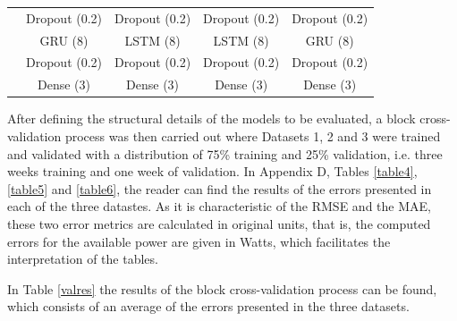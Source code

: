\begin{table}[htbp]
\begin{tabular}{r|cccccccc}
          & \multicolumn{2}{c}{Dropout (0.2)} & \multicolumn{2}{c}{Dropout (0.2)} & \multicolumn{2}{c}{Dropout (0.2)} & \multicolumn{2}{c}{Dropout (0.2)} \\
          & \multicolumn{2}{c}{GRU (8)} & \multicolumn{2}{c}{LSTM (8)} & \multicolumn{2}{c}{LSTM (8)} & \multicolumn{2}{c}{GRU (8)} \\
          & \multicolumn{2}{c}{Dropout (0.2)} & \multicolumn{2}{c}{Dropout (0.2)} & \multicolumn{2}{c}{Dropout (0.2)} & \multicolumn{2}{c}{Dropout (0.2)} \\
          & \multicolumn{2}{c}{Dense (3)} & \multicolumn{2}{c}{Dense (3)} & \multicolumn{2}{c}{Dense (3)} & \multicolumn{2}{c}{Dense (3)} \\
    \end{tabular}%
  \label{tableModels}%
\end{table}%

After defining the structural details of the models to be evaluated, a block cross-validation process was then carried out where Datasets 1, 2 and 3 were trained and validated with a distribution of 75\% training and 25\% validation, i.e. three weeks training and one week of validation. In Appendix D, Tables \ref{table4}, \ref{table5} and \ref{table6}, the reader can find the results of the errors presented in each of the three datastes. As it is characteristic of the \ac{RMSE} and the \ac{MAE}, these two error metrics are calculated in original units, that is, the computed errors for the available power are given in Watts, which facilitates the interpretation of the tables.

 In Table \ref{valres} the results of the block cross-validation process can be found, which consists of an average of the errors presented in the three datasets. 


